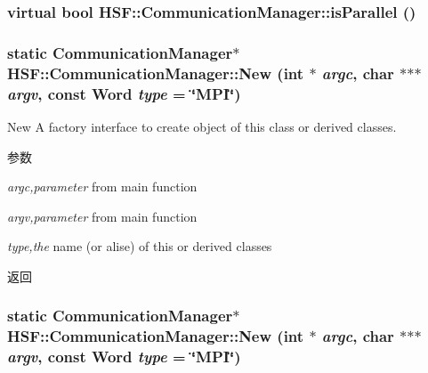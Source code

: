 \label{classHSF_1_1CommunicationManager_a1a8ea32f81aa56766552980fa3825127}
\hypertarget{classHSF_1_1CommunicationManager_a1a8ea32f81aa56766552980fa3825127}{
\subsubsection[{isParallel}]{\setlength{\rightskip}{0pt plus 5cm}virtual bool HSF::CommunicationManager::isParallel ()}}
\label{classHSF_1_1CommunicationManager_a1a8ea32f81aa56766552980fa3825127}
\hypertarget{classHSF_1_1CommunicationManager_a4ab7d9f97d7fe999a6b8173af7ff0dd7}{
\subsubsection[{New}]{\setlength{\rightskip}{0pt plus 5cm}static {\bf CommunicationManager}$\ast$ HSF::CommunicationManager::New (int $\ast$ {\em argc}, \/  char $\ast$$\ast$$\ast$ {\em argv}, \/  const Word {\em type} = {\ttfamily \char`\"{}MPI\char`\"{}})}}
\label{classHSF_1_1CommunicationManager_a4ab7d9f97d7fe999a6b8173af7ff0dd7}


New A factory interface to create object of this class or derived classes. 
\begin{DoxyParams}{参数}
\item[{\em argc,parameter}]from main function \item[{\em argv,parameter}]from main function \item[{\em type,the}]name (or alise) of this or derived classes \end{DoxyParams}
\begin{DoxyReturn}{返回}

\end{DoxyReturn}
\hypertarget{classHSF_1_1CommunicationManager_a4ab7d9f97d7fe999a6b8173af7ff0dd7}{
\subsubsection[{New}]{\setlength{\rightskip}{0pt plus 5cm}static {\bf CommunicationManager}$\ast$ HSF::CommunicationManager::New (int $\ast$ {\em argc}, \/  char $\ast$$\ast$$\ast$ {\em argv}, \/  const Word {\em type} = {\ttfamily \char`\"{}MPI\char`\"{}})}}
\label{classHSF_1_1CommunicationManager_a4ab7d9f97d7fe999a6b8173af7ff0dd7}



